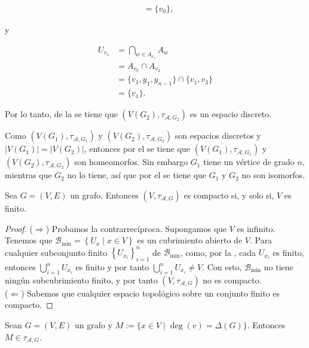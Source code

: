 \begin{Obs}
\begin{itemize}
\begin{ceqn}
\begin{align*}
                    &= \{v_0\},
         \end{align*}
         \end{ceqn}
         y
         \begin{ceqn}
         \begin{align*}
            U_{v_1} &= \bigcap_{w\in A_{v_1}}A_w \\
                    &= A_{v_0}\cap A_{v_2} \\
                    &= \{v_1,y_1,y_{n-1}\}\cap \{v_1,v_3\} \\
                    &= \{v_1\}.
         \end{align*}
         \end{ceqn}
         Por lo tanto, de la  se tiene que $(V(G_2),\tau_{\mathcal{A},G_2})$ es un espacio discreto.
   \end{itemize}
   Como $(V(G_1),\tau_{\mathcal{A},G_1})$ y $(V(G_2),\tau_{\mathcal{A},G_2})$ son espacios discretos y $|V(G_1)|=|V(G_2)|$, entonces por el  se tiene que  $(V(G_1),\tau_{\mathcal{A},G_1})$ y $(V(G_2),\tau_{\mathcal{A},G_2})$ son homeomorfos. Sin embargo $G_1$ tiene un vértice de grado $n$, mientras que $G_2$ no lo tiene, así que por el  se tiene que $G_1$ y $G_2$ no son isomorfos.
\end{Obs}
\begin{Prop}
   Sea $G=(V,E)$ un grafo. Entonces $(V,\tau_{\mathcal{A},G})$ es compacto si, y solo si, $V$ es finito. 
\end{Prop}
\begin{proof}
   ($\Rightarrow$) Probamos la contrarrecíproca. Supongamos que $V$ es infinito. Tenemos que $\mathcal{B}_{\min}=\left\lbrace U_x\mid x\in V\right\rbrace$ es un cubrimiento abierto de $V$. Para cualquier subconjunto finito $\left\{ U_{x_i}\right\}_{i=1}^{n}$ de $\mathcal{B}_{\min}$, como, por la , cada $U_{x_i}$ es finito, entonces $\bigcup_{i=1}^{n}U_{x_i}$ es finito y por tanto $\bigcup_{i=1}^{n}U_{x_i}\ne V$. Con esto, $\mathcal{B}_{\min}$ no tiene ningún subcubrimiento finito, y por tanto $(V,\tau_{\mathcal{A},G})$ no es compacto.\\
   ($\Leftarrow$) Sabemos que cualquier espacio topológico sobre un conjunto finito es compacto.
\end{proof}
\begin{Prop}
   Sean $G=(V,E)$ un grafo y $M:=\{x\in V\mid \operatorname{deg}(v)=\Delta (G)\}$. Entonces $M\in\tau_{\mathcal{A},G}$. 
\end{Prop}
